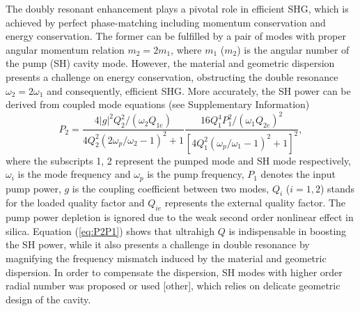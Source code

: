 \documentclass[a4paper,8pt,hyperref, twocolumn]{article}
\begin{document}

The doubly resonant enhancement plays a pivotal role in efficient SHG, which is achieved by perfect phase-matching including momentum conservation and energy conservation.
The former can be fulfilled by a pair of modes with proper angular momentum relation $m_2=2m_1$, where $m_1$ ($m_2$) is the angular number of the pump (SH) cavity mode. 
However, the material and geometric dispersion presents a challenge on energy conservation, obstructing the double resonance $\omega_2=2\omega_1$ and consequently, efficient SHG. 
More accurately, the SH power can be derived from coupled mode equations (see Supplementary Information)%
\begin{equation}
P_2 = \frac{4|g|^2Q_2^2/(\omega_2Q_{1e})}{4Q_2^2(2\omega_p/\omega_2-1)^2+1}\frac{16Q_1^4P_1^2/(\omega_1Q_{2e})^2}{[4Q_1^2(\omega_p/\omega_1-1)^2+1]^2},
\label{eq:P2P1}
\end{equation}
where the subscripts 1, 2 represent the pumped mode and SH mode respectively, $\omega_i$ is the mode frequency and $\omega_p$ is the pump frequency, $P_1$ denotes the input pump power, $g$ is the coupling coefficient between two modes, %
$Q_i$ ($i=1, 2$) stands for the loaded quality factor %
and $Q_{ie}$ represents the external quality factor. The pump power depletion is ignored due to the weak second order nonlinear effect in silica.
Equation (\ref{eq:P2P1}) shows that ultrahigh $Q$ is indispensable in boosting the SH power, while it also presents a challenge in double resonance by magnifying the frequency mismatch induced by the material and geometric dispersion.
In order to compensate the dispersion, SH modes with higher order radial number was proposed or used  \cite{kozyreff2008whispering}[other], which relies on delicate geometric design of the cavity.
\end{document}
